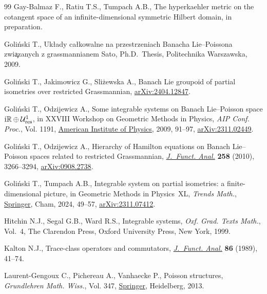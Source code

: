\documentclass[pdftex]{sigma}
\theoremstyle{definition}
\numberwithin{equation}{section}
\begin{document}
\begin{thebibliography}{99}
Gay-Balmaz F., Ratiu T.S., Tumpach A.B., The hyperkaehler metric on the
 cotangent space of an infinite-dimensional symmetric {H}ilbert domain, in
 preparation.

Goli\'nski T., Uk{\l}ady ca{\l}kowalne na przestrzeniach {B}anacha
 {L}ie--{P}oissona zwi\c{a}zanych z grassmannianem {S}ato, Ph.D.~Thesis,
 {P}olitechnika Warszawska, 2009.

Goli\'nski T., Jakimowicz G., Sli\.{z}ewska A., Banach {L}ie groupoid of
 partial isometries over restricted {G}rassmannian, \href{https://arxiv.org/abs/2404.12847}{arXiv:2404.12847}.

Goli\'nski T., Odzijewicz A., Some integrable systems on {B}anach
 {L}ie--{P}oisson space ${\rm i}\mathbb{R}\oplus \mathcal{U}^1_{\textrm{res}}$, in
 {XXVIII} {W}orkshop on {G}eometric {M}ethods in {P}hysics, \textit{AIP Conf.
 Proc.}, Vol. 1191, \href{https://doi.org/10.1063/1.3275603}{American Institute of Physics}, 2009, 91--97,
 \href{https://arxiv.org/abs/2311.02449}{arXiv:2311.02449}.

Goli\'nski T., Odzijewicz A., Hierarchy of {H}amilton equations on {B}anach
 {L}ie--{P}oisson spaces related to restricted {G}rassmannian,
 \href{https://doi.org/10.1016/j.jfa.2010.01.019}{\textit{J.~Funct. Anal.}} \textbf{258} (2010), 3266--3294, \href{https://arxiv.org/abs/0908.2738}{arXiv:0908.2738}.

Goli\'nski T., Tumpach A.B., Integrable system on partial isometries: a
 finite-dimensional picture, in Geometric {M}ethods in {P}hysics~{XL}, \textit{Trends Math.}, \href{https://doi.org/10.1007/978-3-031-62407-0_5}{Springer}, Cham, 2024, 49--57, \href{https://arxiv.org/abs/2311.07412}{arXiv:2311.07412}.

Hitchin N.J., Segal G.B., Ward R.S., Integrable systems, \textit{Oxf. Grad.
 Texts Math.}, Vol.~4, The Clarendon Press, Oxford University Press, New York,
 1999.

Kalton N.J., Trace-class operators and commutators, \href{https://doi.org/10.1016/0022-1236(89)90064-5}{\textit{J.~Funct. Anal.}}
 \textbf{86} (1989), 41--74.

Laurent-Gengoux C., Pichereau A., Vanhaecke P., Poisson structures,
 \textit{Grundlehren Math. Wiss.}, Vol. 347, \href{https://doi.org/10.1007/978-3-642-31090-4}{Springer}, Heidelberg, 2013.


\end{thebibliography}
\end{document}
